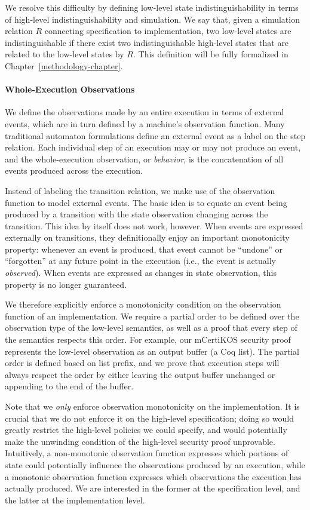 We resolve this difficulty by defining low-level state 
indistinguishability in terms of high-level indistinguishability
and simulation. We say that, given a simulation relation $R$ connecting
specification to implementation, two low-level
states are indistinguishable if there exist two indistinguishable high-level 
states that are related to the low-level states by $R$.
This definition will be fully formalized in Chapter~\ref{methodology-chapter}.

\paragraph{Whole-Execution Observations}
We define the observations made by an entire execution in terms
of external events, which are in turn defined by a machine's
observation function. Many traditional automaton formulations
define an external event as a label on the step relation.
Each individual step of an execution may or may not produce
an event, and the whole-execution observation, or \emph{behavior},
is the concatenation of all events produced across the execution.

Instead of labeling the transition relation,
we make use of the observation function to model external events. The 
basic idea is to equate an event being produced
by a transition with the state observation changing across
the transition. This idea by itself does not work, however. 
When events are expressed externally on 
transitions, they definitionally enjoy an important monotonicity 
property: whenever an event is produced, that event cannot be 
``undone'' or ``forgotten'' at any future point in the execution
(i.e., the event is actually \emph{observed}). 
When events are expressed as changes in state observation, this property 
is no longer guaranteed.

We therefore explicitly enforce a monotonicity condition
on the observation function of an implementation. We require a partial
order to be defined over the observation type of the low-level semantics,
as well as a proof that every step of the semantics respects this order. 
For example, our mCertiKOS security proof represents the low-level observation as an
output buffer (a Coq list). The partial order is defined based on list prefix, 
and we prove that execution steps will always respect the order by either 
leaving the output buffer unchanged or appending to the end of the buffer.

Note that we \emph{only} enforce observation monotonicity on the 
implementation. It is crucial that we do not enforce it on the
high-level specification; doing so would greatly restrict the high-level
policies we could specify, and would potentially make the unwinding
condition of the high-level security proof unprovable. Intuitively,
a non-monotonic observation function expresses which portions of 
state could potentially influence the observations produced by an execution,
while a monotonic observation function expresses which observations
the execution has actually produced. We are interested in the former
at the specification level, and the latter at the implementation level.

